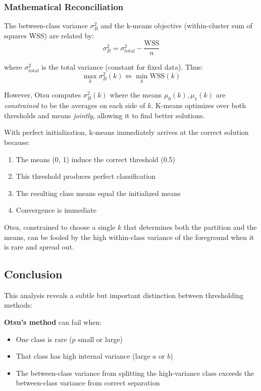 \documentclass[11pt,a4paper]{article}
\begin{document}
\subsubsection{Mathematical Reconciliation}

The between-class variance $\sigma_B^2$ and the k-means objective (within-cluster sum of squares WSS) are related by:
$$\sigma_B^2 = \sigma_{\text{total}}^2 - \frac{\text{WSS}}{n}$$

where $\sigma_{\text{total}}^2$ is the total variance (constant for fixed data). Thus:
$$\max_k \sigma_B^2(k) \iff \min_k \text{WSS}(k)$$

However, Otsu computes $\sigma_B^2(k)$ where the means $\mu_0(k), \mu_1(k)$ are \textit{constrained} to be the averages on each side of $k$. K-means optimizes over both thresholds and means \textit{jointly}, allowing it to find better solutions.

With perfect initialization, k-means immediately arrives at the correct solution because:
\begin{enumerate}
    \item The means (0, 1) induce the correct threshold (0.5)
    \item This threshold produces perfect classification
    \item The resulting class means equal the initialized means
    \item Convergence is immediate
\end{enumerate}

Otsu, constrained to choose a single $k$ that determines both the partition and the means, can be fooled by the high within-class variance of the foreground when it is rare and spread out.

\subsection{Conclusion}

This analysis reveals a subtle but important distinction between thresholding methods:

\textbf{Otsu's method} can fail when:
\begin{itemize}
    \item One class is rare ($p$ small or large)
    \item That class has high internal variance (large $a$ or $b$)
    \item The between-class variance from splitting the high-variance class exceeds the between-class variance from correct separation
\end{itemize}
\end{document}
